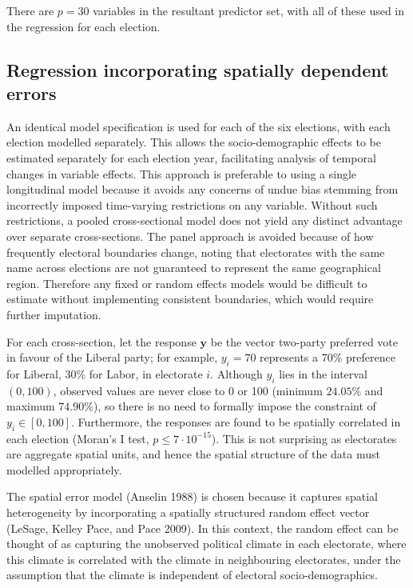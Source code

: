 \documentclass[times, doublespace]{anzsauth}
\begin{document}
There are \(p=30\) variables in the resultant predictor set, with all of these used in the regression for each election.

\hypertarget{regression-incorporating-spatially-dependent-errors}{%
\subsection{Regression incorporating spatially dependent errors}\label{regression-incorporating-spatially-dependent-errors}}

An identical model specification is used for each of the six elections, with each election modelled separately. This allows the socio-demographic effects to be estimated separately for each election year, facilitating analysis of temporal changes in variable effects. This approach is preferable to using a single longitudinal model because it avoids any concerns of undue bias stemming from incorrectly imposed time-varying restrictions on any variable. Without such restrictions, a pooled cross-sectional model does not yield any distinct advantage over separate cross-sections. The panel approach is avoided because of how frequently electoral boundaries change, noting that electorates with the same name across elections are not guaranteed to represent the same geographical region. Therefore any fixed or random effects models would be difficult to estimate without implementing consistent boundaries, which would require further imputation.

For each cross-section, let the response \(\bm{y}\) be the vector two-party preferred vote in favour of the Liberal party; for example, \(y_i = 70\) represents a 70\% preference for Liberal, 30\% for Labor, in electorate \(i\). Although \(y_i\) lies in the interval \((0,100)\), observed values are never close to 0 or 100 (minimum \(24.05 \%\) and maximum \(74.90 \%\)), so there is no need to formally impose the constraint of \(y_i \in [0,100]\). Furthermore, the responses are found to be spatially correlated in each election (Moran's I test, \(p \le 7\cdot10^{-15}\)). This is not surprising as electorates are aggregate spatial units, and hence the spatial structure of the data must modelled appropriately.

The spatial error model (Anselin 1988) is chosen because it captures spatial heterogeneity by incorporating a spatially structured random effect vector (LeSage, Kelley Pace, and Pace 2009). In this context, the random effect can be thought of as capturing the unobserved political climate in each electorate, where this climate is correlated with the climate in neighbouring electorates, under the assumption that the climate is independent of electoral socio-demographics.
\end{document}
